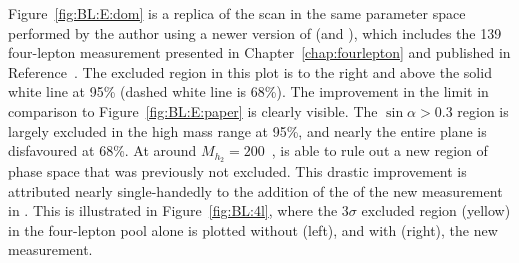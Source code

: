 Figure~\ref{fig:BL:E:dom} is a replica of the scan in the same parameter space performed by the author using a newer version of \contur (and \rivet), which includes the \unit{139}{\invfb} four-lepton measurement presented in Chapter~\ref{chap:fourlepton} and published in Reference~\cite{m4l2021_paper}. The excluded region in this plot is to the right and above the solid white line at 95\% (dashed white line is 68\%). The improvement in the limit in comparison to Figure~\ref{fig:BL:E:paper} is clearly visible. The $\sin\alpha > 0.3$ region is largely excluded in the high mass range at 95\%, and nearly the entire plane is disfavoured at 68\%. At around $M_{h_2}=200$~\GeV, \contur is able to rule out a new region of phase space that was previously not excluded. This drastic improvement is attributed nearly single-handedly to the addition of the of the new \mFourL{} measurement in \rivet. This is illustrated in Figure~\ref{fig:BL:4l}, where the $3\sigma$ excluded region (yellow) in the four-lepton pool alone is plotted without (left), and with (right), the new measurement.

